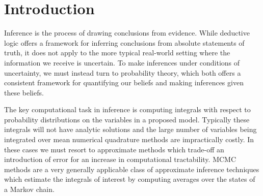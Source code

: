 \chapter{Introduction}\label{ch:probabilistic-modelling}

Inference is the process of drawing conclusions from evidence. 
While deductive logic offers a framework for inferring conclusions from absolute statements of truth, it does not apply to the more typical real-world setting where the information we receive is uncertain. 
To make inferences under conditions of uncertainty, we must instead turn to probability theory, which both offers a consistent framework for quantifying our beliefs and making inferences given these beliefs. %


The key computational task in inference is computing integrals with respect to probability distributions on the variables in a proposed model. Typically these integrals will not have analytic solutions and the large number of variables being integrated over mean numerical quadrature methods are impractically costly. In these cases we must resort to approximate methods which trade-off an introduction of error for an increase in computational tractability. \ac{MCMC} methods are a very generally applicable class of approximate inference techniques which estimate the integrals of interest by computing averages over the states of a Markov chain. 

